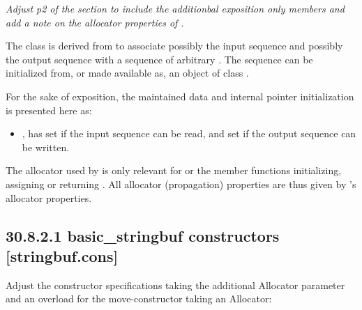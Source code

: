 \documentclass[ebook,11pt,article]{memoir}
\renewcommand{\iref}[1]{[#1]}
\begin{document}

\emph{Adjust p2 of the section to include the additionbal exposition only members and add a note on the allocator properties of .}

\pnum
The class
is derived from
to associate possibly the input sequence and possibly
the output sequence with a sequence of arbitrary
.
The sequence can be initialized from, or made available as, an object of class
.


\pnum
For the sake of exposition, the maintained data and internal pointer initialization is presented here as:
\begin{itemize}
\item
{},
has
set if the input sequence can be read, and
set if the output sequence can be written.
\end{itemize}

\begin{addedblock}
\pnum
\begin{note}
The allocator used by  is only relevant for  or the member functions initializing, assigning or returning . All allocator (propagation) properties are thus given by 's allocator properties.
\end{note}
\end{addedblock}



\subsection{30.8.2.1 basic\_stringbuf constructors [stringbuf.cons]}
\begin{em}
Adjust the constructor specifications taking the additional Allocator parameter and an overload for the move-constructor taking an Allocator:
\end{em}
\end{document}
